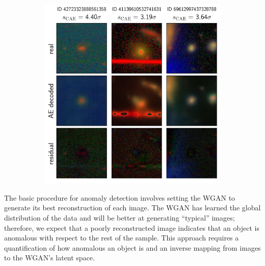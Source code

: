 \begin{figure}
\hfill
\begin{subfigure}{.325\textwidth}
  \centering
  \includegraphics[width=1\linewidth]{recons_ae_5to20sigcomb.png}
  \caption{}
  \label{fig:recon_ae_5sig}
\end{subfigure}
\caption{}
\label{fig:recon_ae}
\end{figure}

The basic procedure for anomaly detection involves setting the WGAN to generate its best reconstruction of each image.
The WGAN has learned the global distribution of the data and will be better at generating ``typical'' images; therefore, we expect that a poorly reconstructed image indicates that an object is anomalous with respect to the rest of the sample.
This approach requires a quantification of how anomalous an object is and an inverse mapping from images to the WGAN's latent space.

